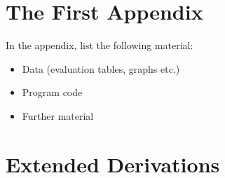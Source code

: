%
\chapter{The First Appendix}

In the appendix, list the following material:

\begin{itemize}
    \item Data (evaluation tables, graphs etc.)
    \item Program code
    \item Further material
\end{itemize}

\chapter{Extended Derivations}
